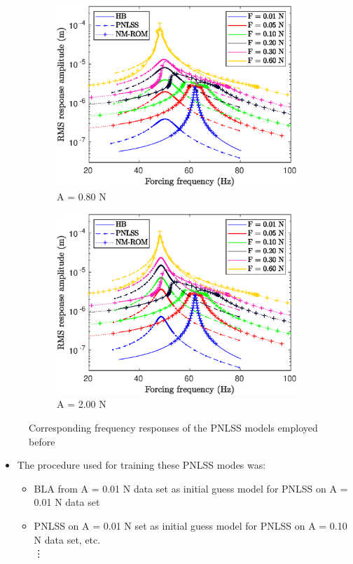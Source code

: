 \documentclass[aspectratio=169]{beamer}
\begin{document}
\begin{frame}[allowframebreaks]
\begin{figure}[!h]
\begin{subfigure}[!h]{0.2\linewidth}
      \includegraphics[width=\linewidth]{../../benchmark4/extabs_fig/b4_fresp_comp_famp08_nx23}
      \caption{A = 0.80 N}
    \end{subfigure}%
    \begin{subfigure}[!h]{0.2\linewidth}
      \includegraphics[width=\linewidth]{../../benchmark4/extabs_fig/b4_fresp_comp_famp20_nx23}
      \caption{A = 2.00 N}
    \end{subfigure}%
    \caption{Corresponding frequency responses of the PNLSS models
      employed before}
  \end{figure}
  \begin{itemize}
  \item The procedure used for training these PNLSS modes was:
    \begin{itemize}
    \item BLA from A = 0.01 N data set as initial guess model for
      PNLSS on A = 0.01 N data set
    \item PNLSS on A = 0.01 N set as initial guess model for PNLSS on
      A = 0.10 N data set, etc.\\
      \hspace{2cm}\vdots
    \end{itemize}
  \end{itemize}
\end{frame}
\end{document}
